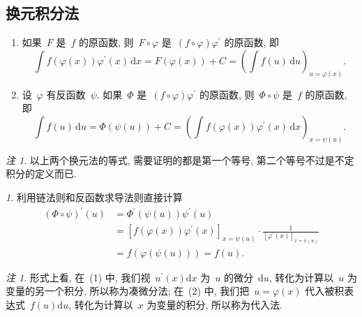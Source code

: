 \documentclass[12pt]{ctexbook}
\theoremstyle{definition}
\theoremstyle{remark}
\newtheorem{rem}[thm]{注}
\newtheorem*{pf}{\CJKfamily{kai}{证}}
\begin{document}
\subsection{换元积分法}

\begin{enumerate}
\item 如果~$F$ 是~$f$ 的原函数,
则~$F\circ\varphi$ 是~$\left(  f\circ\varphi\right)
\varphi^{\prime}$ 的原函数, 即\begin{equation}
\int f(\varphi(x))\varphi^{\prime}(x)\,\mathrm{d}x=F(\varphi(x))+C=\left(
\int f(u)\,\mathrm{d}u\right)  _{u=\varphi(x)}\text{.}
\tag{凑微分法}%
\end{equation}


\item 设~$\varphi$ 有反函数~$\psi$.
如果~$\Phi$ 是~$\left(  f\circ\varphi\right)  \varphi
^{\prime}$ 的原函数, 则~$\Phi\circ\psi$
是~$f$ 的原函数, 即\begin{equation}
\int f(u)\,\mathrm{d}u=\Phi(\psi(u))+C=\left(  \int f(\varphi(x))\varphi
^{\prime}(x)\,\mathrm{d}x\right)  _{x=\psi(u)}\text{.}%
\tag{代入法}%
\end{equation}

\end{enumerate}

\begin{rem}
以上两个换元法的等式,
需要证明的都是第一个等号,
第二个等号不过是不定积分的定义而已.
\end{rem}

\begin{pf}
利用链法则和反函数求导法则直接计算\begin{align*}
\left(  \Phi\circ\psi\right)  ^{\prime}(u) &  =\Phi^{\prime}(\psi
(u))\psi^{\prime}(u)\\
&  =\left[  f(\varphi(x))\varphi^{\prime}(x)\right]  _{x=\psi(u)}\cdot\frac
{1}{\left[  \varphi^{\prime}(x)\right]  _{x=\psi(u)}}\\
&  =f(\varphi(\psi(u)))=f(u)\text{.}%
\end{align*}

\end{pf}

\begin{rem}
形式上看, 在~(1) 中,
我们视~$u^{\prime}(x)\mathrm{d}x$ 为~$u$
的微分~$\mathrm{d}u$,
转化为计算以~$u$
为变量的另一个积分,
所以称为凑微分法; 在~(2)
中, 我们把~$u=\varphi(x)$
代入被积表达式~$f(u)\mathrm{d}u$,
转化为计算以~$x$
为变量的积分, 所以称为代入法.
\end{rem}
\end{document}
